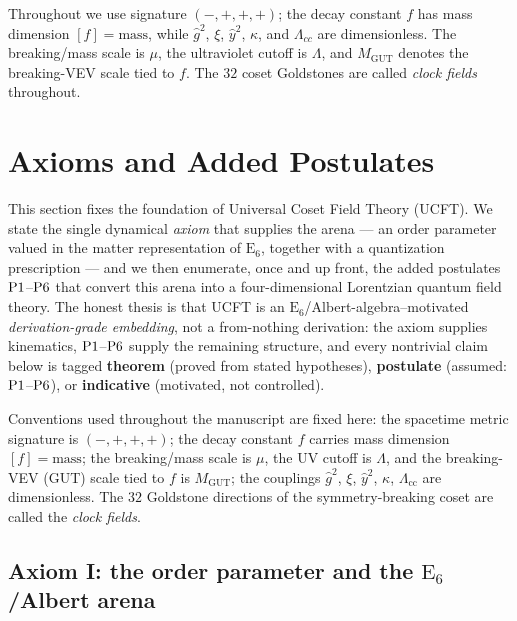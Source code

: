 \documentclass[11pt]{article}
\theoremstyle{plain}
\theoremstyle{definition}
\theoremstyle{remark}
\newcommand{\E}[1]{\mathrm{E}_{#1}}
\newcommand{\ESix}{\E{6}}
\newcommand{\Pone}{\textnormal{P1}}
\newcommand{\Psix}{\textnormal{P6}}
\newcommand{\MGUT}{M_{\mathrm{GUT}}}
\newcommand{\ghat}{\hat g}
\newcommand{\yhat}{\hat y}
\begin{document}
Throughout we use signature $(-,+,+,+)$; the decay constant $f$ has mass
dimension $[f]=\text{mass}$, while $\hat g^{2}$, $\xi$, $\hat y^{2}$, $\kappa$,
and $\Lambda_{cc}$ are dimensionless. The breaking/mass scale is $\mu$, the
ultraviolet cutoff is $\Lambda$, and $M_{\mathrm{GUT}}$ denotes the
breaking-VEV scale tied to $f$. The $32$ coset Goldstones are called
\emph{clock fields} throughout.


\section{Axioms and Added Postulates}
\label{sec:axioms:main}
\label{sec:AxiomsAlbertSSB}

This section fixes the foundation of Universal Coset Field Theory (UCFT).
We state the single dynamical \emph{axiom} that supplies the arena --- an
order parameter valued in the matter representation of $\ESix$, together
with a quantization prescription --- and we then enumerate, once and up
front, the added postulates $\Pone$--$\Psix$ that convert this arena into a
four-dimensional Lorentzian quantum field theory. The honest thesis is that
UCFT is an $\ESix$/Albert-algebra--motivated \emph{derivation-grade
embedding}, not a from-nothing derivation: the axiom supplies kinematics,
$\Pone$--$\Psix$ supply the remaining structure, and every nontrivial claim
below is tagged \textbf{theorem} (proved from stated hypotheses),
\textbf{postulate} (assumed: $\Pone$--$\Psix$), or
\textbf{indicative} (motivated, not controlled).

Conventions used throughout the manuscript are fixed here: the spacetime
metric signature is $(-,+,+,+)$; the decay constant $f$ carries mass
dimension $[f]=\text{mass}$; the breaking/mass scale is $\mu$, the UV cutoff
is $\Lambda$, and the breaking-VEV (GUT) scale tied to $f$ is $\MGUT$; the
couplings $\ghat^2$, $\xi$, $\yhat^2$, $\kappa$, $\Lambda_{\mathrm{cc}}$ are
dimensionless. The $32$ Goldstone directions of the symmetry-breaking coset
are called the \emph{clock fields}.

\subsection{Axiom I: the order parameter and the \texorpdfstring{$\ESix$}{E6}/Albert arena}
\label{sec:axioms:axiomI}
\end{document}
